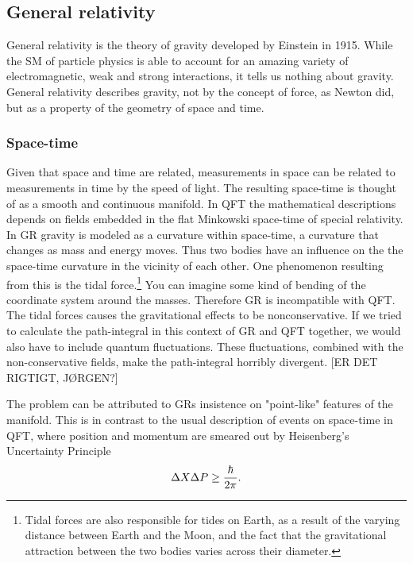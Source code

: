 \subsection{General relativity}
General relativity is the theory of gravity developed by Einstein in 1915. While the SM of particle physics is able to account for an amazing variety of electromagnetic, weak and strong interactions, it tells us nothing about gravity. General relativity describes gravity, not by the concept of force, as Newton did, but as a property of the geometry of space and time.

\subsubsection{Space-time}
Given that space and time are related, measurements in space can be related to measurements in time by the speed of light. The resulting space-time is thought of as a smooth and continuous manifold. In QFT the mathematical descriptions depends on fields embedded in the flat Minkowski space-time of special relativity. In GR gravity is modeled as a curvature within space-time, a curvature that changes as mass and energy moves. Thus two bodies have an influence on the the space-time curvature in the vicinity of each other. One phenomenon resulting from this is the tidal force.\footnote{Tidal forces are also responsible for tides on Earth, as a result of the varying distance between Earth and the Moon, and the fact that the gravitational attraction between the two bodies varies across their diameter.} You can imagine some kind of bending of the coordinate system around the masses. Therefore GR is incompatible with QFT. The tidal forces causes the gravitational effects to be nonconservative. If we tried to calculate the path-integral in this context of GR and QFT together, we would also have to include quantum fluctuations. These fluctuations, combined with the non-conservative fields, make the path-integral horribly divergent. [ER DET RIGTIGT, JØRGEN?]

The problem can be attributed to GRs insistence on "point-like" features of the manifold. This is in contrast to the usual description of events on space-time in QFT, where position and momentum are smeared out by Heisenberg's Uncertainty Principle
\begin{equation} \label{eq:heisenberg}
	\Delta X \Delta P \geq {\hbar \over 2 \pi}.
\end{equation}

